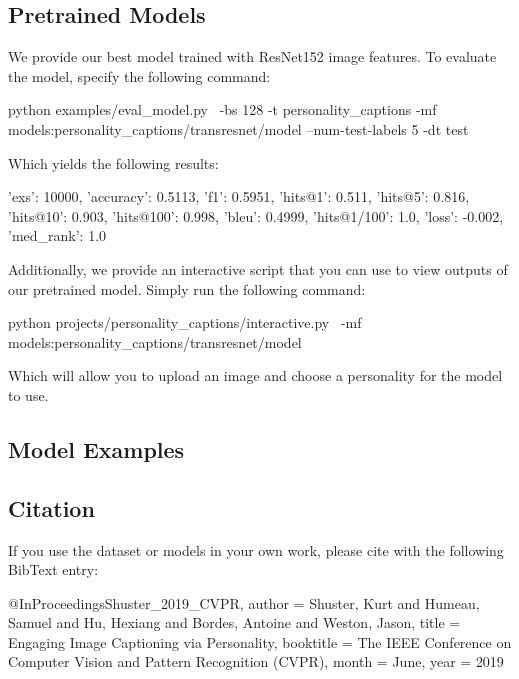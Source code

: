 \subsection*{Pretrained Models}

We provide our best model trained with Res\+Net152 image features. To evaluate the model, specify the following command\+: \begin{DoxyVerb}  python examples/eval_model.py \
      -bs 128 -t personality_captions
      -mf models:personality_captions/transresnet/model
      --num-test-labels 5 -dt test
\end{DoxyVerb}


Which yields the following results\+: \begin{DoxyVerb}  {'exs': 10000, 'accuracy': 0.5113, 'f1': 0.5951, 'hits@1': 0.511, 'hits@5': 0.816,
  'hits@10': 0.903, 'hits@100': 0.998, 'bleu': 0.4999, 'hits@1/100': 1.0,
  'loss': -0.002, 'med_rank': 1.0}
\end{DoxyVerb}


Additionally, we provide an interactive script that you can use to view outputs of our pretrained model. Simply run the following command\+: \begin{DoxyVerb}  python projects/personality_captions/interactive.py \
  -mf models:personality_captions/transresnet/model
\end{DoxyVerb}


Which will allow you to upload an image and choose a personality for the model to use.

\subsection*{Model Examples}



\subsection*{Citation}

If you use the dataset or models in your own work, please cite with the following Bib\+Text entry\+: \begin{DoxyVerb}    @InProceedings{Shuster_2019_CVPR,
    author = {Shuster, Kurt and Humeau, Samuel and Hu, Hexiang and Bordes, Antoine and Weston, Jason},
    title = {Engaging Image Captioning via Personality},
    booktitle = {The IEEE Conference on Computer Vision and Pattern Recognition (CVPR)},
    month = {June},
    year = {2019}
    }\end{DoxyVerb}
 